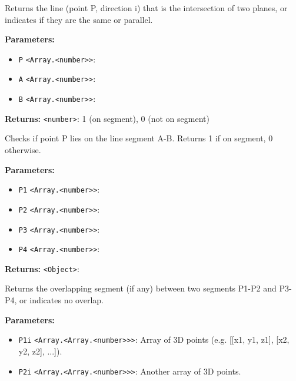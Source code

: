 \documentclass[12pt,a4paper]{article}
\begin{document}
\noindent Returns the line (point P, direction i) that is the intersection 
of two planes, or indicates if they are the same or parallel.

\vspace{5mm}
\noindent {}


\noindent \textbf{Parameters:}
\begin{itemize}
  \item \texttt{P} \texttt{<Array.<number>>}: 
  \item \texttt{A} \texttt{<Array.<number>>}: 
  \item \texttt{B} \texttt{<Array.<number>>}: 
\end{itemize}

\noindent \textbf{Returns:} \texttt{<number>}: 1 (on segment), 0 (not on segment)

\noindent Checks if point P lies on the line segment A-B.
Returns 1 if on segment, 0 otherwise.

\vspace{5mm}
\noindent {}


\noindent \textbf{Parameters:}
\begin{itemize}
  \item \texttt{P1} \texttt{<Array.<number>>}: 
  \item \texttt{P2} \texttt{<Array.<number>>}: 
  \item \texttt{P3} \texttt{<Array.<number>>}: 
  \item \texttt{P4} \texttt{<Array.<number>>}: 
\end{itemize}

\noindent \textbf{Returns:} \texttt{<Object>}: 

\noindent Returns the overlapping segment (if any) between two segments P1-P2 and P3-P4,
or indicates no overlap.

\vspace{5mm}
\noindent {}


\noindent \textbf{Parameters:}
\begin{itemize}
  \item \texttt{P1i} \texttt{<Array.<Array.<number>>>}: Array of 3D points (e.g. [[x1, y1, z1], [x2, y2, z2], ...]).
  \item \texttt{P2i} \texttt{<Array.<Array.<number>>>}: Another array of 3D points.
\end{itemize}
\end{document}
